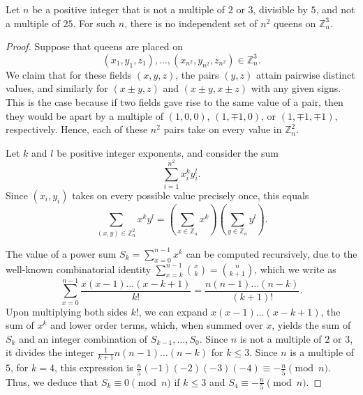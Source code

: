 \documentclass[10pt,a4paper]{amsart}
\begin{document}
\begin{theorem}\label{525}
Let $n$ be a positive integer that is not a multiple of $2$ or $3$, divisible by $5$, and not a multiple of $25$. For such $n$, there is no independent set of $n^{2}$ queens on $\mathbb{Z}_n^3$.
\end{theorem}

\begin{proof}
Suppose that queens are placed on
$$(x_1,y_1,z_1),\dots,(x_{n^2},y_{n^2},z_{n^2})\in \mathbb{Z}_n^3.$$
We claim that for these fields $(x,y,z)$, the pairs $(y,z)$ attain pairwise distinct values, and similarly for $(x\pm y,z)$ and $(x\pm y,x\pm z)$ with any given signs. This is the case because if two fields gave rise to the same value of a pair, then they would be apart by a multiple of $(1,0,0)$, $(1,\mp 1,0)$, or $(1,\mp 1,\mp 1)$, respectively. Hence, each of these $n^2$ pairs take on every value in $\mathbb{Z}_n^2$.

Let $k$ and $l$ be positive integer exponents, and consider the sum
$$\sum_{i=1}^{n^2} x_i^k y_i^l.$$
Since $(x_i,y_i)$ takes on every possible value precisely once, this equals
$$\sum_{(x,y)\in \mathbb{Z}_n^2}x^ky^l=\left(\sum_{x\in \mathbb{Z}_n}x^k\right)\left(\sum_{y\in \mathbb{Z}_n}y^l\right).$$

The value of a power sum $S_k=\sum_{x=0}^{n-1}x^k$ can be computed recursively, due to the well-known combinatorial identity $\sum_{x=k}^{n-1} \binom {x}{k}=\binom{n}{k+1}$, which we write as
$$\sum_{x=0}^{n-1} \frac{x(x-1)\dots(x-k+1)}{k!}=\frac{n(n-1)\dots(n-k)}{(k+1)!}.$$
Upon multiplying both sides $k!$, we can expand $x(x-1)\dots(x-k+1)$, the sum of $x^k$ and lower order terms, which, when summed over $x$, yields the sum of $S_k$ and an integer combination of $S_{k-1},\ldots,S_0$. Since $n$ is not a multiple of $2$ or $3$, it divides the integer $\frac1{k+1} n(n-1)\dots(n-k)$ for $k\le 3$. Since $n$ is a multiple of $5$, for $k=4$, this expression is $\frac{n}{5}(-1)(-2)(-3)(-4)\equiv -\frac{n}{5} \pmod n$. Thus, we deduce that $S_k\equiv 0\pmod n$ if $k\le 3$ and $S_4\equiv -\frac{n}{5}\pmod n$.


\end{proof}
\end{document}
